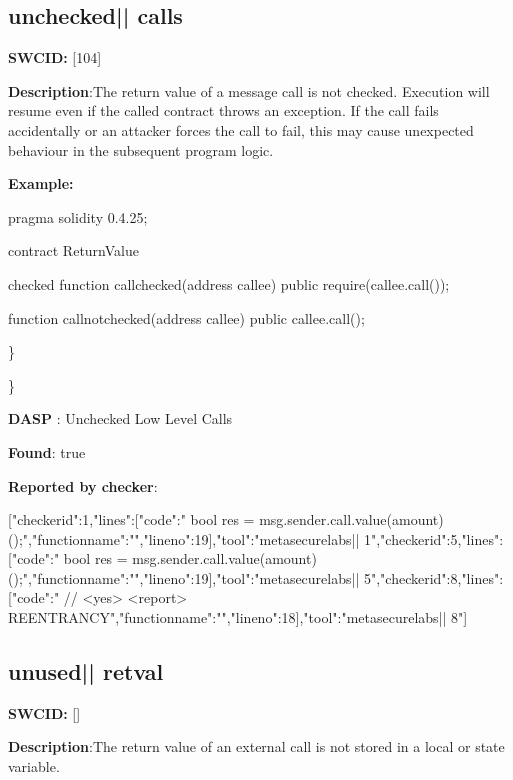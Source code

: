 \documentclass{article}
\begin{document}
\subsection{unchecked{|\textunderscore| }calls} 
\textbf{SWC{\textunderscore }ID:} [104]

\textbf{Description}:The return value of a message call is not checked. Execution will resume even if the called contract throws an exception. If the call fails accidentally or an attacker forces the call to fail, this may cause unexpected behaviour in the subsequent program logic.


\textbf{Example:} 
\begin{ffcode} 

pragma solidity 0.4.25;

contract ReturnValue {

checked
function callchecked(address callee) public {
    require(callee.call());
  }

  function callnotchecked(address callee) public {
    callee.call();
  }
}

\end{ffcode} 
\} 

\} 

\textbf{DASP} : Unchecked Low Level Calls

\textbf{Found}: true

\textbf{Reported by checker}: 
\begin{ffcode} 

[{"checker\textunderscore id":1,"lines":[{"code":"      bool res = msg.sender.call.value(amount)();\n","function\textunderscore name":"","line\textunderscore no":19}],"tool":"metasecurelabs|\textendash| 1"},{"checker\textunderscore id":5,"lines":[{"code":"      bool res = msg.sender.call.value(amount)();\n","function\textunderscore name":"","line\textunderscore no":19}],"tool":"metasecurelabs|\textendash| 5"},{"checker\textunderscore id":8,"lines":[{"code":"      // <yes> <report> REENTRANCY\n","function\textunderscore name":"","line\textunderscore no":18}],"tool":"metasecurelabs|\textendash| 8"}]
\end{ffcode} 
\subsection{unused{|\textunderscore| }retval} 
\textbf{SWC{\textunderscore }ID:} []

\textbf{Description}:The return value of an external call is not stored in a local or state variable.
\end{document}
